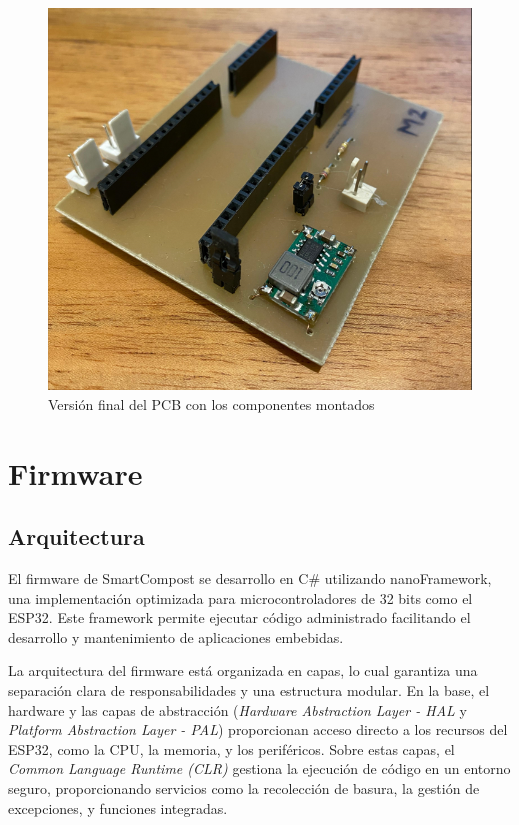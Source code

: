 \begin{figure}[H]
	\centering
	\includegraphics[scale=.8]{./Figures/Hardware/PCB/placa-final.png}
	\caption{Versión final del PCB con los componentes montados}
	\label{fig:pcbFinal}
\end{figure}




\section{Firmware}

\subsection{Arquitectura}

El firmware de SmartCompost se desarrollo en C\# utilizando  nanoFramework, una implementación optimizada para microcontroladores de 32 bits como el ESP32. Este framework permite ejecutar código administrado  facilitando el desarrollo y mantenimiento de aplicaciones embebidas.

La arquitectura del firmware está organizada en capas, lo cual garantiza una separación clara de responsabilidades y una estructura modular. En la base, el hardware y las capas de abstracción (\textit{Hardware Abstraction Layer - HAL} y \textit{Platform Abstraction Layer - PAL}) proporcionan acceso directo a los recursos del ESP32, como la CPU, la memoria, y los periféricos. Sobre estas capas, el \textit{Common Language Runtime (CLR)} gestiona la ejecución de código en un entorno seguro, proporcionando servicios como la recolección de basura, la gestión de excepciones, y funciones integradas.

